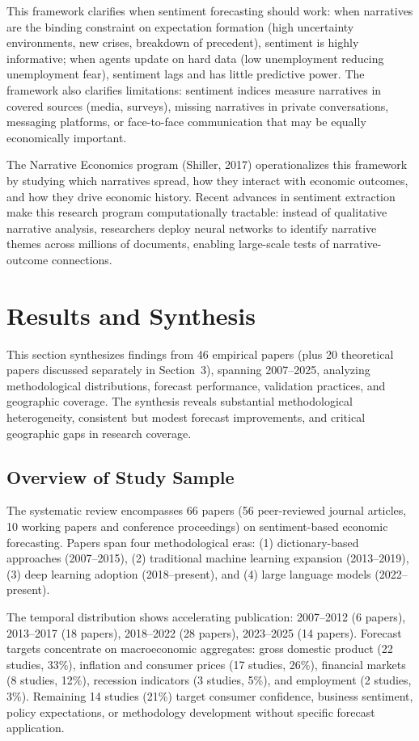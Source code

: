 \documentclass[11pt,twocolumn]{article}
\begin{document}
This framework clarifies when sentiment forecasting should work: when narratives are the binding constraint on expectation formation (high uncertainty environments, new crises, breakdown of precedent), sentiment is highly informative; when agents update on hard data (low unemployment reducing unemployment fear), sentiment lags and has little predictive power. The framework also clarifies limitations: sentiment indices measure narratives in covered sources (media, surveys), missing narratives in private conversations, messaging platforms, or face-to-face communication that may be equally economically important.

The Narrative Economics program (Shiller, 2017) operationalizes this framework by studying which narratives spread, how they interact with economic outcomes, and how they drive economic history. Recent advances in sentiment extraction make this research program computationally tractable: instead of qualitative narrative analysis, researchers deploy neural networks to identify narrative themes across millions of documents, enabling large-scale tests of narrative-outcome connections.

\section{Results and Synthesis}

This section synthesizes findings from 46 empirical papers (plus 20 theoretical papers discussed separately in Section~3), spanning 2007--2025, analyzing methodological distributions, forecast performance, validation practices, and geographic coverage. The synthesis reveals substantial methodological heterogeneity, consistent but modest forecast improvements, and critical geographic gaps in research coverage.

\subsection{Overview of Study Sample}

The systematic review encompasses 66 papers (56 peer-reviewed journal articles, 10 working papers and conference proceedings) on sentiment-based economic forecasting. Papers span four methodological eras: (1) dictionary-based approaches (2007--2015), (2) traditional machine learning expansion (2013--2019), (3) deep learning adoption (2018--present), and (4) large language models (2022--present). 

The temporal distribution shows accelerating publication: 2007--2012 (6 papers), 2013--2017 (18 papers), 2018--2022 (28 papers), 2023--2025 (14 papers). Forecast targets concentrate on macroeconomic aggregates: gross domestic product (22 studies, 33\%), inflation and consumer prices (17 studies, 26\%), financial markets (8 studies, 12\%), recession indicators (3 studies, 5\%), and employment (2 studies, 3\%). Remaining 14 studies (21\%) target consumer confidence, business sentiment, policy expectations, or methodology development without specific forecast application.
\end{document}
